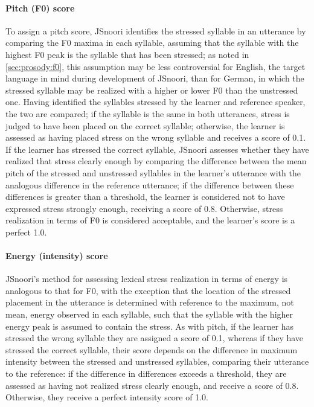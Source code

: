 	
	\paragraph{Pitch (F0) score}
	
	To assign a pitch score, JSnoori identifies the stressed syllable in an utterance  by comparing the F0 maxima in each syllable,
	 assuming that the syllable with the highest F0 peak is the syllable that has been stressed;
	 as noted in \cref{sec:prosody:f0}, this assumption may be less controversial for English, the target language in mind during development of JSnoori, than for German, in which the stressed syllable may be realized with a higher or lower F0 than the unstressed one.
	 Having identified the syllables stressed by the learner and reference speaker, the two are compared;
	if the syllable is the same in both utterances, stress is judged to have been placed on the correct syllable; otherwise, the learner is assessed as having placed stress on the wrong syllable and receives a score of 0.1. If the learner has stressed the correct syllable, JSnoori assesses whether they have realized that stress clearly enough by comparing the difference between the mean pitch of the stressed and unstressed syllables in the learner's utterance
	 with the analogous difference in the reference utterance; if the difference between these differences is greater than a threshold,
	  the learner is considered not to have expressed stress strongly enough, receiving a score of 0.8. Otherwise, stress realization in terms of F0 is considered acceptable, and the learner's score is a perfect 1.0.
	
	
	\paragraph{Energy (intensity) score}
	
	JSnoori's method for assessing lexical stress realization in terms of energy is analogous to that for F0, with the exception that the location of the stressed placement in the utterance is determined with reference to the maximum, not mean, energy observed in each syllable, 
	such that the syllable with the higher energy peak is assumed to contain the stress. 
	As with pitch, if the learner has stressed the wrong syllable they are assigned a score of 0.1, whereas if they have stressed the correct syllable, their score depends on the difference in maximum intensity between the stressed and unstressed syllables, comparing their utterance to the reference: if the difference in differences exceeds a threshold, they are assessed as having not realized stress clearly enough, and receive a score of 0.8. Otherwise, they receive a perfect intensity score of 1.0.



